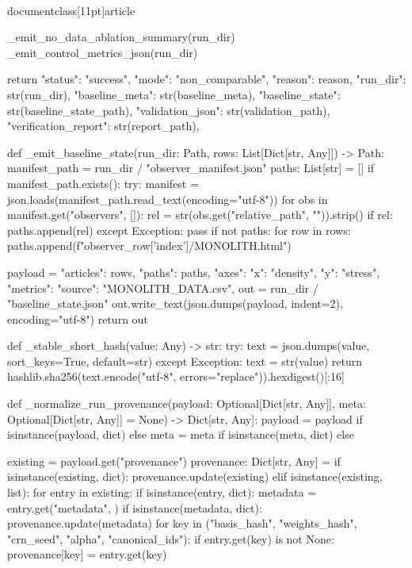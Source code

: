 \\documentclass[11pt]{article}
\begin{document}
\begin{CodeBlock}
    _emit_no_data_ablation_summary(run_dir)
    _emit_control_metrics_json(run_dir)

    return {
        "status": "success",
        "mode": "non_comparable",
        "reason": reason,
        "run_dir": str(run_dir),
        "baseline_meta": str(baseline_meta),
        "baseline_state": str(baseline_state_path),
        "validation_json": str(validation_path),
        "verification_report": str(report_path),
    }


def _emit_baseline_state(run_dir: Path, rows: List[Dict[str, Any]]) -> Path:
    manifest_path = run_dir / "observer_manifest.json"
    paths: List[str] = []
    if manifest_path.exists():
        try:
            manifest = json.loads(manifest_path.read_text(encoding="utf-8"))
            for obs in manifest.get("observers", []):
                rel = str(obs.get("relative_path", "")).strip()
                if rel:
                    paths.append(rel)
        except Exception:
            pass
    if not paths:
        for row in rows:
            paths.append(f"observer_{row['index']}/MONOLITH.html")

    payload = {
        "articles": rows,
        "paths": paths,
        "axes": {"x": "density", "y": "stress"},
        "metrics": {"source": "MONOLITH_DATA.csv"},
    }
    out = run_dir / "baseline_state.json"
    out.write_text(json.dumps(payload, indent=2), encoding="utf-8")
    return out


def _stable_short_hash(value: Any) -> str:
    try:
        text = json.dumps(value, sort_keys=True, default=str)
    except Exception:
        text = str(value)
    return hashlib.sha256(text.encode("utf-8", errors="replace")).hexdigest()[:16]


def _normalize_run_provenance(payload: Optional[Dict[str, Any]], meta: Optional[Dict[str, Any]] = None) -> Dict[str, Any]:
    payload = payload if isinstance(payload, dict) else {}
    meta = meta if isinstance(meta, dict) else {}

    existing = payload.get("provenance")
    provenance: Dict[str, Any] = {}
    if isinstance(existing, dict):
        provenance.update(existing)
    elif isinstance(existing, list):
        for entry in existing:
            if isinstance(entry, dict):
                metadata = entry.get("metadata", {})
                if isinstance(metadata, dict):
                    provenance.update(metadata)
                for key in ("basis_hash", "weights_hash", "crn_seed", "alpha", "canonical_ids"):
                    if entry.get(key) is not None:
                        provenance[key] = entry.get(key)


\end{CodeBlock}
\end{document}
